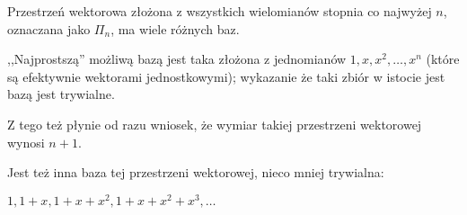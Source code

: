 Przestrzeń wektorowa złożona z wszystkich wielomianów stopnia co najwyżej \(n\), oznaczana jako \(\Pi_n\), ma wiele różnych baz.

,,Najprostszą'' możliwą bazą jest taka złożona z jednomianów \(1, x, x^2, \dots, x^{n}\) (które są efektywnie wektorami jednostkowymi); wykazanie że taki zbiór w istocie jest bazą jest trywialne.

Z tego też płynie od razu wniosek, że wymiar takiej przestrzeni wektorowej wynosi \(n+1\).

Jest też inna baza tej przestrzeni wektorowej, nieco mniej trywialna:

\(1, 1+x, 1+x+x^2, 1+x+x^2+x^3, \dots\)